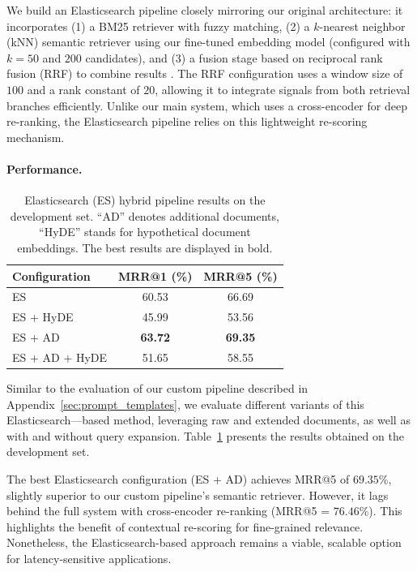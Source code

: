 We build an Elasticsearch pipeline closely mirroring our original architecture: it incorporates (1) a BM25 retriever with fuzzy matching, (2) a $k$-nearest neighbor (kNN) semantic retriever using our fine-tuned embedding model (configured with $k=50$ and $200$ candidates), and (3) a fusion stage based on reciprocal rank fusion (RRF) to combine results \cite{cormack_reciprocal_2009}. The RRF configuration uses a window size of $100$ and a rank constant of $20$, allowing it to integrate signals from both retrieval branches efficiently. Unlike our main system, which uses a cross-encoder for deep re-ranking, the Elasticsearch pipeline relies on this lightweight re-scoring mechanism.


\paragraph{Performance.}
\begin{table}[h]
\caption{Elasticsearch (ES) hybrid pipeline results on the development set. ``AD'' denotes additional documents, ``HyDE'' stands for hypothetical document embeddings. The best results are displayed in bold.}
\label{tab:Elasticsearch_results}
\centering
\begin{tabular}{lcc}
\toprule
\textbf{Configuration} & \textbf{MRR@1 (\%)} & \textbf{MRR@5 (\%)}\\
\midrule
ES & 60.53 & 66.69 \\
ES + HyDE & 45.99 & 53.56 \\
ES + AD & \textbf{63.72} & \textbf{69.35} \\
ES + AD + HyDE & 51.65 & 58.55 \\
\bottomrule
\end{tabular}
\end{table}

Similar to the evaluation of our custom pipeline described in Appendix~\ref{sec:prompt_templates}, we evaluate different variants of this Elasticsearch—based method, leveraging raw and extended documents, as well as with and without query expansion. Table~\ref{tab:Elasticsearch_results} presents the results obtained on the development set.

The best Elasticsearch configuration (ES + AD) achieves MRR@5 of $69.35$\%, slightly superior to our custom pipeline’s semantic retriever. However, it lags behind the full system with cross-encoder re-ranking (MRR@5 = $76.46$\%). This highlights the benefit of contextual re-scoring for fine-grained relevance. Nonetheless, the Elasticsearch-based approach remains a viable, scalable option for latency-sensitive applications.